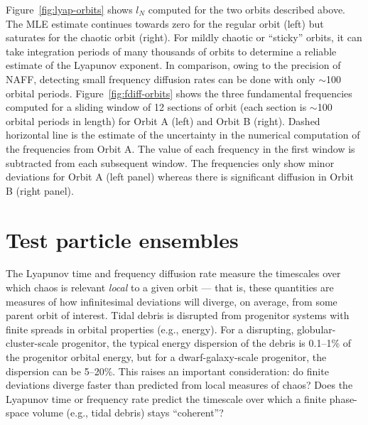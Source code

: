 \documentclass[letterpaper,12pt,preprint]{aastex}
\begin{document}
Figure~\ref{fig:lyap-orbits} shows $l_N$ computed for the two orbits described above. The MLE estimate continues towards zero for the regular orbit (left) but saturates for the chaotic orbit (right). For mildly chaotic or ``sticky'' orbits, it can take integration periods of many thousands of orbits to determine a reliable estimate of the Lyapunov exponent. In comparison, owing to the precision of NAFF, detecting small frequency diffusion rates can be done with only $\sim$100 orbital periods. Figure~\ref{fig:fdiff-orbits} shows the three fundamental frequencies computed for a sliding window of 12 sections of orbit (each section is $\sim$100 orbital periods in length) for Orbit A (left) and Orbit B (right). Dashed horizontal line is the estimate of the uncertainty in the numerical computation of the frequencies from Orbit A. The value of each frequency in the first window is subtracted from each subsequent window. The frequencies only show minor deviations for Orbit A (left panel) whereas there is significant diffusion in Orbit B (right panel).

\section{Test particle ensembles} \label{sec:ensemble}

The Lyapunov time and frequency diffusion rate measure the timescales over which chaos is relevant \emph{local} to a given orbit --- that is, these quantities are measures of how infinitesimal deviations will diverge, on average, from some parent orbit of interest. Tidal debris is disrupted from progenitor systems with finite spreads in orbital properties (e.g., energy). For a disrupting, globular-cluster-scale progenitor, the typical energy dispersion of the debris is 0.1--1\% of the progenitor orbital energy, but for a dwarf-galaxy-scale progenitor, the dispersion can be 5--20\%. This raises an important consideration: do finite deviations diverge faster than predicted from local measures of chaos? Does the Lyapunov time or frequency rate predict the timescale over which a finite phase-space volume (e.g., tidal debris) stays ``coherent''?
\end{document}
